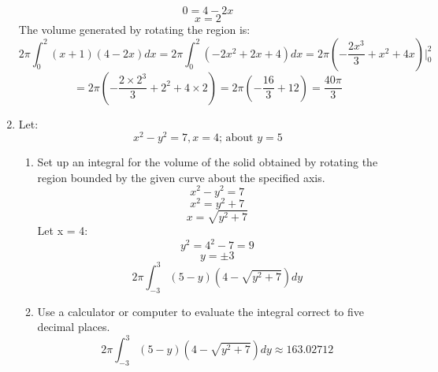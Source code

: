 \documentclass[12pt]{article}
\begin{document}
\begin{enumerate}
\begin{center}
    \end{center}
    \[0 = 4-2x\]
    \[x = 2\]
    The volume generated by rotating the region is:
    \[2\pi\int_0^2 (x+1)(4-2x)dx = 2\pi\int_0^2 (-2x^2+2x+4)dx = 2\pi(-\frac{2x^3}{3} + x^2 + 4x)|_0^2\]
    \[ = 2\pi(-\frac{2\times2^3}{3} + 2^2 + 4\times2) = 2\pi(-\frac{16}{3} + 12) = \frac{40\pi}{3}\]
\newpage
\setcounter{enumi}{35}
    \item Let:
    \[x^2-y^2=7,x=4\text{; about }y = 5\]
    \begin{center}
    \end{center}
    \begin{enumerate}
        \item Set up an integral for the volume of the solid obtained by rotating the region bounded by the given curve about the specified axis.
        \[x^2-y^2 = 7\]
        \[x^2 = y^2 + 7\]
        \[x = \sqrt{y^2 + 7}\]
        Let x = 4:
        \[y^2 = 4^2 - 7 = 9\]
        \[y = \pm 3\]
        \[2\pi\int_{-3}^{3} (5-y)(4-\sqrt{y^2+7})dy\]
        \item Use a calculator or computer to evaluate the integral correct to five decimal places.
        \[2\pi\int_{-3}^{3} (5-y)(4-\sqrt{y^2+7})dy \approx 163.02712\]
    \end{enumerate}
\end{enumerate}
\end{document}
